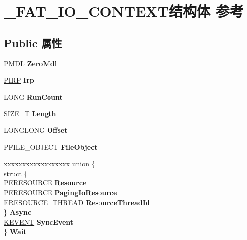 \hypertarget{struct___f_a_t___i_o___c_o_n_t_e_x_t}{}\section{\+\_\+\+F\+A\+T\+\_\+\+I\+O\+\_\+\+C\+O\+N\+T\+E\+X\+T结构体 参考}
\label{struct___f_a_t___i_o___c_o_n_t_e_x_t}
\subsection*{Public 属性}
\begin{DoxyCompactItemize}
\item 
\mbox{\label{struct___f_a_t___i_o___c_o_n_t_e_x_t_af08cc7d1234a48f9d63225be19b3d362}} 
\hyperlink{interfacevoid}{P\+M\+DL} {\bfseries Zero\+Mdl}
\item 
\mbox{\label{struct___f_a_t___i_o___c_o_n_t_e_x_t_a1a198b84e0afb360c7479076fb0ba11b}} 
\hyperlink{interfacevoid}{P\+I\+RP} {\bfseries Irp}
\item 
\mbox{\label{struct___f_a_t___i_o___c_o_n_t_e_x_t_aba931d0ca0f362c9a3823afd5a209c5a}} 
L\+O\+NG {\bfseries Run\+Count}
\item 
\mbox{\label{struct___f_a_t___i_o___c_o_n_t_e_x_t_a5572bb9a0311cd3ac4008430f9e1f257}} 
S\+I\+Z\+E\+\_\+T {\bfseries Length}
\item 
\mbox{\label{struct___f_a_t___i_o___c_o_n_t_e_x_t_a894d3ed4a7cb2e6edfe7802ff09c85f5}} 
L\+O\+N\+G\+L\+O\+NG {\bfseries Offset}
\item 
\mbox{\label{struct___f_a_t___i_o___c_o_n_t_e_x_t_a76d21cdc6ed57ce07d01ec4df41975a8}} 
P\+F\+I\+L\+E\+\_\+\+O\+B\+J\+E\+CT {\bfseries File\+Object}
\item 
\mbox{\label{struct___f_a_t___i_o___c_o_n_t_e_x_t_a78cf2853d4fe000fd4e0828b62f74a6c}} 
\begin{tabbing}
xx\=xx\=xx\=xx\=xx\=xx\=xx\=xx\=xx\=\kill
union \{\\
\>struct \{\\
\>\>PERESOURCE {\bfseries Resource}\\
\>\>PERESOURCE {\bfseries PagingIoResource}\\
\>\>ERESOURCE\_THREAD {\bfseries ResourceThreadId}\\
\>\} {\bfseries Async}\\
\>\hyperlink{struct___k_e_v_e_n_t}{KEVENT} {\bfseries SyncEvent}\\
\} {\bfseries Wait}\\


\end{tabbing}
\end{DoxyCompactItemize}
